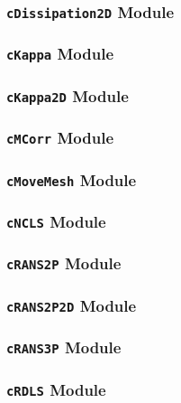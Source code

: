 \documentclass[letterpaper,12pt,english]{sphinxmanual}
\begin{document}
\subsubsection{\texttt{cDissipation2D} Module}
\label{api/src:cdissipation2d-module}

\subsubsection{\texttt{cKappa} Module}
\label{api/src:ckappa-module}

\subsubsection{\texttt{cKappa2D} Module}
\label{api/src:ckappa2d-module}

\subsubsection{\texttt{cMCorr} Module}
\label{api/src:cmcorr-module}

\subsubsection{\texttt{cMoveMesh} Module}
\label{api/src:cmovemesh-module}

\subsubsection{\texttt{cNCLS} Module}
\label{api/src:cncls-module}

\subsubsection{\texttt{cRANS2P} Module}
\label{api/src:crans2p-module}

\subsubsection{\texttt{cRANS2P2D} Module}
\label{api/src:crans2p2d-module}

\subsubsection{\texttt{cRANS3P} Module}
\label{api/src:crans3p-module}

\subsubsection{\texttt{cRDLS} Module}
\label{api/src:crdls-module}
\end{document}
